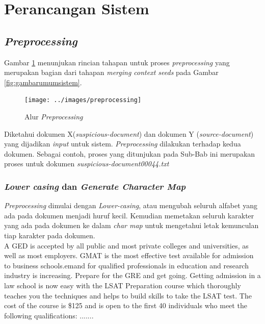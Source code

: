 \documentclass[../Book.tex]{subfiles}
\begin{document}
	\section{Perancangan Sistem}
	\subsection{\textit{Preprocessing}}
	
	\noindent Gambar \ref{fig:preprocessing} menunjukan rincian tahapan untuk proses \textit{preprocessing} yang merupakan bagian dari tahapan \textit{merging context seeds} pada Gambar \ref{fig:gambarumumsistem}.
	
	\begin{center}
		\begin{figure}[H]
			\texttt{[image: ../images/preprocessing]}
			\caption{Alur \textit{Preprocessing}}
			\label{fig:preprocessing}
		\end{figure}
	\end{center}

	\noindent Diketahui dokumen X(\textit{suspicious-document}) dan dokumen Y (\textit{source-document}) yang dijadikan \textit{input} untuk sistem. \textit{Preprocessing} dilakukan terhadap kedua dokumen. Sebagai contoh, proses yang ditunjukan pada Sub-Bab ini merupakan proses untuk dokumen \textit{suspicious-document00044.txt} \\

	\subsubsection{\textit{Lower casing} dan \textit{Generate Character Map}}
	\noindent \textit{Preprocessing} dimulai dengan \textit{Lower-casing}, atau mengubah seluruh alfabet yang ada pada dokumen menjadi huruf kecil. Kemudian memetakan seluruh karakter yang ada pada dokumen ke dalam \textit{char map} untuk mengetahui letak kemunculan tiap karakter pada dokumen.  \\
	
	{\selectfont
		\noindent A GED is accepted by all public and most private
		colleges and universities, as well as most employers. GMAT is the most effective test available for admission to business schools.emand for qualified professionals in education and research industry is increasing. Prepare for the GRE and get going. Getting admission in a law school is now easy with the LSAT Preparation course which thoroughly teaches you the techniques and helps to build skills to take the LSAT test. The cost of the course is \$125 and is open to
		the first 40 individuals who meet the
		following
		qualifications:
		.......
	} \\
\end{document}
